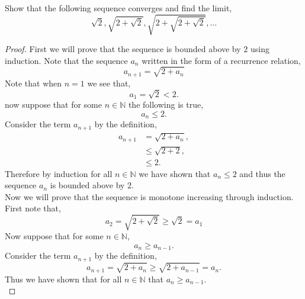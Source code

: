 \documentclass[12pt]{article}
\makeatletter
\theoremstyle{homework}
\newenvironment{exercise}[1]
{\def\@currentlabel{#1}\exercisecore}
{\endexercisecore}
\newcommand{\Nats}{\ensuremath{\mathbb N}}
\makeatother
\begin{document}
\begin{exercise}{2.4.3(a)} Show that the following sequence converges and find the limit,
  \begin{equation*}
    \sqrt{2}, \sqrt{2+\sqrt{2}}, \sqrt{2+ \sqrt{2+\sqrt{2}}} ,\dots
  \end{equation*}
  
  \begin{proof}
    First we will prove that the sequence is bounded above by $2$ using induction. Note that the sequence $a_n$ written in the form of a recurrence relation,
    \begin{equation}
      a_{n+1} = \sqrt{2+ a_n}
    \end{equation}
    Note that when $n = 1$ we see that,
    \begin{equation}
      a_1 = \sqrt{2} < 2.
    \end{equation}
    now suppose that for some $n \in \Nats$ the following is true,
    \begin{equation*}
      a_n \le 2.
    \end{equation*}
    Consider the term $a_{n+1}$ by the definition,
    \begin{align*}
      a_{n+1} &= \sqrt{2 + a_n},\\
      &\le \sqrt{2+2},\\
      &\le 2.      
    \end{align*}
    Therefore by induction for all $n \in \Nats$ we have shown that $a_n \le 2$ and thus the sequence $a_n$ is bounded above by 2.\\

    Now we will prove that the sequence is monotone increasing through induction. First note that,
    \begin{equation*}
      a_2 = \sqrt{2+ \sqrt{2}} \geq \sqrt{2} = a_1
    \end{equation*}
    Now suppose that for some $n \in \Nats$,
    \begin{equation*}
      a_n \geq a_{n-1}.
    \end{equation*}
    Consider the term $a_{n+1}$ by the definition,
    \begin{equation*}
      a_{n+1} = \sqrt{2+ a_n} \geq \sqrt{2+ a_{n-1}} = a_n.
    \end{equation*}
    Thus we have shown that for all $n \in \Nats$ that $a_n \geq a_{n-1}$.\\


\end{proof}
\end{exercise}
\end{document}
